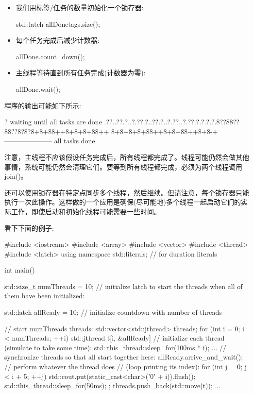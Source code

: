 \begin{itemize}
\item 
我们用标签/任务的数量初始化一个锁存器:

\begin{cpp}
std::latch allDone{tags.size()};
\end{cpp}

\item 
每个任务完成后减少计数器:

\begin{cpp}
allDone.count_down();
\end{cpp}

\item 
主线程等待直到所有任务完成(计数器为零):

\begin{cpp}
allDone.wait();
\end{cpp}
\end{itemize}

程序的输出可能如下所示:

\begin{shell}
?
waiting until all tasks are done
.??..??.?..?.??.?..??.?..?.??..?.??.?.?.?.?.8??88??88??8?8?8+8+88++8+8+8+88++
8+8+8+8+88++8+8+88++8+8-+---------------------
all tasks done
\end{shell}

注意，主线程不应该假设任务完成后，所有线程都完成了。线程可能仍然会做其他事情，系统可能仍然会清理它们。要等到所有线程都完成，必须为两个线程调用join()。

还可以使用锁存器在特定点同步多个线程，然后继续。但请注意，每个锁存器只能执行一次此操作。这样做的一个应用是确保(尽可能地)多个线程一起启动它们的实际工作，即使启动和初始化线程可能需要一些时间。

看下下面的例子:



\begin{cpp}
#include <iostream>
#include <array>
#include <vector>
#include <thread>
#include <latch>
using namespace std::literals; // for duration literals

int main()
{
	std::size_t numThreads = 10;
	// initialize latch to start the threads when all of them have been initialized:
	
	std::latch allReady = 10; // initialize countdown with number of threads
	
	// start numThreads threads:
	std::vector<std::jthread> threads;
	for (int i = 0; i < numThreads; ++i) {
		std::jthread t{[i, &allReady] {
				// initialize each thread (simulate to take some time):
				std::this_thread::sleep_for(100ms * i);
				...
				// synchronize threads so that all start together here:
				allReady.arrive_and_wait();
				// perform whatever the thread does
				// (loop printing its index):
				for (int j = 0; j < i + 5; ++j) {
					std::cout.put(static_cast<char>('0' + i)).flush();
					std::this_thread::sleep_for(50ms);
				}
		}};
		threads.push_back(std::move(t));
	}
	...
}
\end{cpp}

